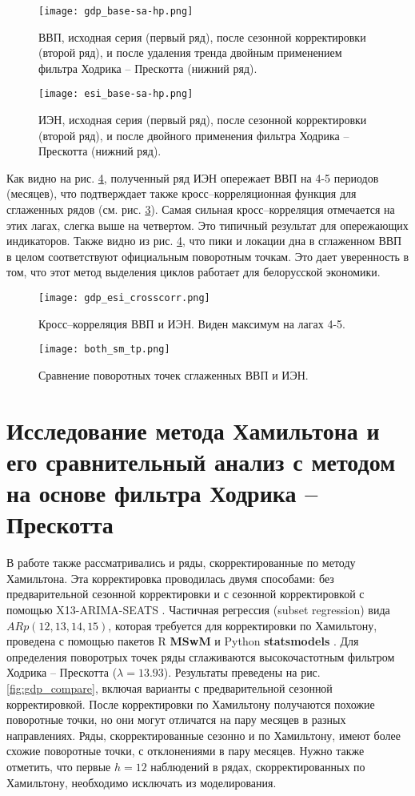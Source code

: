 \documentclass[../report.tex]{subfiles}
\begin{document}
	\begin{figure}
		\label{fig:hp-gdp}
		\texttt{[image: gdp\_base-sa-hp.png]}
		\caption{ВВП, исходная серия (первый ряд), после сезонной корректировки (второй ряд), и после удаления тренда двойным применением фильтра Ходрика – Прескотта (нижний ряд).}
	\end{figure}
	
	\begin{figure}
		\label{fig:hp-esi}
		\texttt{[image: esi\_base-sa-hp.png]}
		\caption{ИЭН, исходная серия (первый ряд), после сезонной корректировки (второй ряд), и после двойного применения фильтра Ходрика – Прескотта (нижний ряд).}
	\end{figure}
	
	Как видно на рис. \ref{fig:hp-ptcompare}, полученный ряд ИЭН опережает ВВП на 4-5 периодов (месяцев), что подтверждает также кросс–корреляционная функция для сглаженных рядов (см. рис. \ref{fig:ccf}). Самая сильная кросс–корреляция отмечается на этих лагах, слегка выше на четвертом. Это типичный результат для опережающих индикаторов. Также видно из рис. \ref{fig:hp-ptcompare}, что пики и локации дна в сглаженном ВВП в целом соответствуют официальным поворотным точкам. Это дает уверенность в том, что этот метод выделения циклов работает для белорусской экономики.
	
	\begin{figure}
		\label{fig:ccf}
		\texttt{[image: gdp\_esi\_crosscorr.png]}
		\caption{Кросс–корреляция ВВП и ИЭН. Виден максимум на лагах 4-5.}
	\end{figure}	
	
	\begin{figure}
		\label{fig:hp-ptcompare}
		\texttt{[image: both\_sm\_tp.png]}
		\caption{Сравнение поворотных точек сглаженных ВВП и ИЭН.}
	\end{figure}
	
	\section{Исследование метода Хамильтона и его сравнительный анализ с методом на основе фильтра Ходрика – Прескотта}
	В работе также рассматривались и ряды, скорректированные по методу Хамильтона. Эта корректировка проводилась двумя способами: без предварительной сезонной корректировки и с сезонной корректировкой с помощью X13-ARIMA-SEATS \cite{seasonalManual}. Частичная регрессия (subset regression) вида $ARp(12,13,14,15)$, которая требуется для корректировки по Хамильтону, проведена с помощью пакетов R \textbf{MSwM} и Python \textbf{statsmodels} \cite{statsmodels}. Для определения поворотрых точек ряды сглаживаются высокочастотным фильтром Ходрика – Прескотта ($\lambda=13.93$). Результаты преведены на рис. \ref{fig:gdp_compare}, включая варианты с предварительной сезонной корректировкой.  После корректировки по Хамильтону получаются похожие поворотные точки, но они могут отличатся на пару месяцев в разных направлениях. Ряды, скорректированные сезонно и по Хамильтону, имеют более схожие поворотные точки, с отклонениями в пару месяцев. Нужно также отметить, что первые $h=12$ наблюдений в рядах, скорректированных по Хамильтону, необходимо исключать из моделирования.
	
\end{document}
